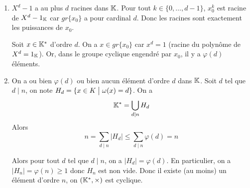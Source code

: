 \begin{solution}
	\phantom{}
	\begin{enumerate}
		\item $X^{d}-1$ a au plus $d$ racines dans $\mathbb{K}$. Pour tout $k\in\{0,\dots,d-1\}$, $x_{0}^{k}$ est racine de $X^{d}-1_{\mathbb{K}}$ car $gr\{x_{0}\}$ a pour cardinal $d$. Donc les racines sont exactement les puissances de $x_{0}$.
		
		Soit $x\in\mathbb{K}^{*}$ d'ordre $d$. On a $x\in gr\{x_{0}\}$ car $x^{d}=1$ (racine du polynôme de $X^{d}=1_{\mathbb{K}}$). Or, dans le groupe cyclique engendré par $x_{0}$, il y a $\varphi(d)$ éléments.

		\item On a ou bien $\varphi(d)$ ou bien aucun élément d'ordre $d$ dans $\mathbb{K}$. Soit $d$ tel que $d\mid n$, on note $H_{d}=\{x\in K\bigm| \omega(x)=d\}$. On a 
		$$\mathbb{K}^{*}=\bigcup_{d\mid n}H_{d}$$
		Alors
		$$n=\sum_{d\mid n}\vert H_{d}\vert\leqslant\sum_{d\mid n}\varphi(d)=n$$

		Alors pour tout $d$ tel que $d\mid n$, on a $\vert H_{d}\vert=\varphi(d)$. En particulier, on a $\vert H_{n}\vert=\varphi(n)\geqslant1$ donc $H_{n}$ est non vide. Donc il existe (au moins) un élément d'ordre $n$, on $(\mathbb{K}^{*},\times)$ est cyclique.
	\end{enumerate}
\end{solution}

